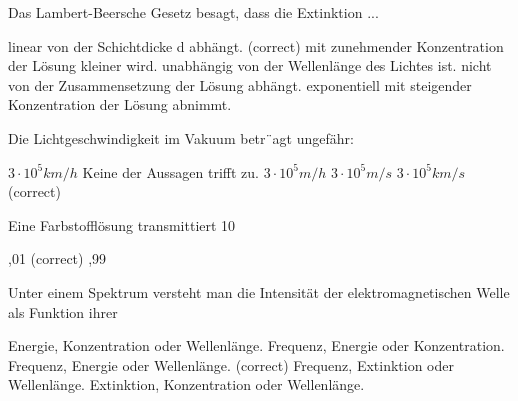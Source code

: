 \documentclass[11pt]{exam}
\begin{document}
\setlength{\voffset}{-0.5in}
\setlength{\headsep}{5pt}

\hspace{2mm}
 \hspace{5mm}
\vspace{4mm}

\begin{questions}

\question Das Lambert-Beersche Gesetz besagt, dass die Extinktion ...

\begin{choices}
	\choice linear von der Schichtdicke d abhängt. (correct)
	\choice mit zunehmender Konzentration der Lösung kleiner wird.
	\choice unabhängig von der Wellenlänge des Lichtes ist.
	\choice nicht von der Zusammensetzung der Lösung abhängt.
	\choice exponentiell mit steigender Konzentration der Lösung abnimmt.
\end{choices}

\vspace{3mm}\question Die Lichtgeschwindigkeit im Vakuum betr¨agt ungefähr:

\begin{choices}
	\choice \( 3 \cdot10^5 km/h \)
	\choice Keine der Aussagen trifft zu.
	\choice \( 3 \cdot10^5 m/h \)
	\choice \( 3 \cdot10^5 m/s \)
	\choice \( 3 \cdot10^5 km/s \) (correct)
\end{choices}

\vspace{3mm}\question Eine Farbstofflösung transmittiert 10 %

\begin{choices}
	,01
	 (correct)
	,99
\end{choices}

\vspace{3mm}\question Unter einem Spektrum versteht man die Intensität der elektromagnetischen Welle als Funktion ihrer

\begin{choices}
	\choice Energie, Konzentration oder Wellenlänge.
	\choice Frequenz, Energie oder Konzentration.
	\choice Frequenz, Energie oder Wellenlänge. (correct)
	\choice Frequenz, Extinktion oder Wellenlänge.
	\choice Extinktion, Konzentration oder Wellenlänge.
\end{choices}


\end{questions}
\end{document}
